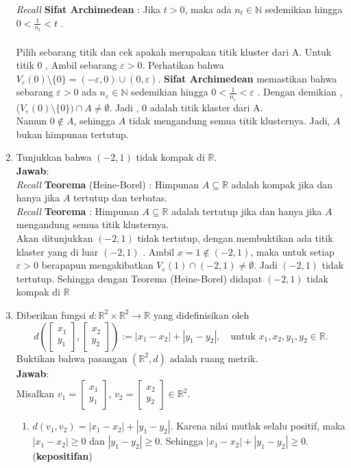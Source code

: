 \documentclass[a4paper, 12pt]{article}
\newcommand{\ans}{\textbf{Jawab}:}
\newcommand{\R}{\mathbb{R}}
\newcommand{\N}{\mathbb{N}}
\begin{document}
\begin{enumerate}
       \newpage
       \textit{Recall} \textbf{Sifat Archimedean} : Jika $t> 0$, maka ada $n_t \in \N$ sedemikian hingga  $0 < \frac{1}{n_t} < t$ .\\\\
       Pilih sebarang titik dan cek apakah merupakan titik kluster dari A. Untuk titik 0 , Ambil sebarang $\varepsilon > 0$. Perhatikan bahwa $V_\varepsilon(0)\setminus \{0\} = (-\varepsilon, 0)\cup(0, \varepsilon)$. \textbf{Sifat Archimedean} memastikan bahwa sebarang $ \varepsilon > 0 $ ada $n_\varepsilon \in \N $ sedemikian hingga   $0 < \frac{1}{n_\varepsilon} < \varepsilon$ . Dengan demikian , ($V_\varepsilon(0)\setminus \{0\}) \cap A \neq \emptyset $. Jadi , 0 adalah titik klaster dari A. \\
       Namun $0\notin A$, sehingga $A$ tidak mengandung semua titik klusternya. Jadi, $A$ bukan himpunan tertutup.

        \item Tunjukkan bahwa $(-2,1)$ tidak kompak di $\R$.\\
        \ans\\
        \textit{Recall} \textbf{Teorema} (Heine-Borel) : Himpunan $A\subseteq\R$ adalah kompak jika dan hanya jika $A$ tertutup dan terbatas.\\
        
        \textit{Recall} \textbf{Teorema} : Himpunan $A\subseteq\R$ adalah tertutup jika dan hanya jika $A$ mengandung semua titik klusternya.\\
        
        Akan ditunjukkan $(-2,1)$ tidak tertutup, dengan membuktikan ada titik klaster yang di luar $(-2,1)$ .  Ambil $x=1\notin(-2,1)$, maka untuk setiap $\varepsilon>0$ berapapun mengakibatkan $V_\varepsilon(1)\cap(-2,1)\ne\emptyset$. Jadi $(-2,1)$ tidak tertutup. Sehingga dengan Teorema (Heine-Borel) didapat $(-2,1)$ tidak kompak di $\R$

        \item Diberikan fungsi $d:\R^2\times\R^2\to\R$ yang didefinisikan oleh
    \[d\left(\begin{bmatrix}x_1\\y_1\end{bmatrix},\begin{bmatrix}x_2\\y_2\end{bmatrix}\right):=
    |x_1-x_2|+|y_1-y_2|,\quad\text{untuk }x_1,x_2,y_1,y_2\in\R.\]
    Buktikan bahwa pasangan $(\R^2,d)$ adalah ruang metrik.\\
    \ans\\
    Misalkan $v_1=\begin{bmatrix}x_1\\y_1\end{bmatrix}$, $v_2=\begin{bmatrix}x_2\\y_2\end{bmatrix}\in \R^2$.
    \begin{enumerate}
        \item $d(v_1,v_2)=|x_1-x_2|+|y_1-y_2|$. Karena nilai mutlak selalu positif, maka 
        $|x_1-x_2|\geq 0$ dan $|y_1-y_2|\geq 0$. Sehingga $|x_1-x_2|+|y_1-y_2|\geq 0$. (\textbf{kepositifan})


\end{enumerate}
\end{enumerate}
\end{document}
